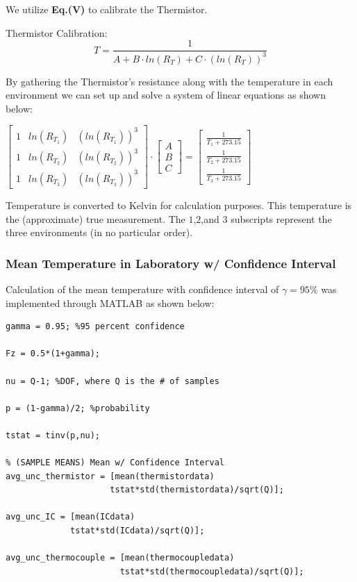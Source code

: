 \documentclass{article}
\begin{document}
We utilize \textbf{Eq.(V)} to calibrate the Thermistor.

Thermistor Calibration:
\[
    T = \dfrac{1}{A + B\cdot ln(R_{T}) + C\cdot (ln(R_{T}))^{3}}
\]

By gathering the Thermistor's resistance along with the temperature in each environment we can set up and solve a system of linear equations as shown below:
\begin{center}
    $\begin{bmatrix}
        1 & ln(R_{T_{1}}) & (ln(R_{T_{1}}))^{3}\\[3pt]
        1 & ln(R_{T_{2}}) & (ln(R_{T_{2}}))^{3}\\[3pt]
        1 & ln(R_{T_{3}}) & (ln(R_{T_{3}}))^{3}
    \end{bmatrix}
    \cdot
    \begin{bmatrix}
        A\\[3pt]
        B\\[3pt]
        C
    \end{bmatrix}
    = 
    \begin{bmatrix}
        \frac{1}{T_{1}+273.15}\\[3pt]
            
        \frac{1}{T_{2}+273.15}\\[3pt]
        
        \frac{1}{T_{3}+273.15}
    \end{bmatrix}$
\end{center}

Temperature is converted to Kelvin for calculation purposes. This temperature is the (approximate) true measurement. The $1$,$2$,and $3$ subscripts represent the three environments (in no particular order).


\subsubsection*{Mean Temperature in Laboratory w/ Confidence Interval}
Calculation of the mean temperature with confidence interval of $\gamma = 95\%$ was implemented through MATLAB as shown below:
\begin{lstlisting}[style=Matlab-editor]
% Confidence Interval in Laboratory
gamma = 0.95; %95 percent confidence

Fz = 0.5*(1+gamma);

nu = Q-1; %DOF, where Q is the # of samples

p = (1-gamma)/2; %probability

tstat = tinv(p,nu); 

% (SAMPLE MEANS) Mean w/ Confidence Interval
avg_unc_thermistor = [mean(thermistordata) 
                     tstat*std(thermistordata)/sqrt(Q)];

avg_unc_IC = [mean(ICdata) 
             tstat*std(ICdata)/sqrt(Q)];

avg_unc_thermocouple = [mean(thermocoupledata)  
                       tstat*std(thermocoupledata)/sqrt(Q)];
\end{lstlisting}
\end{document}
